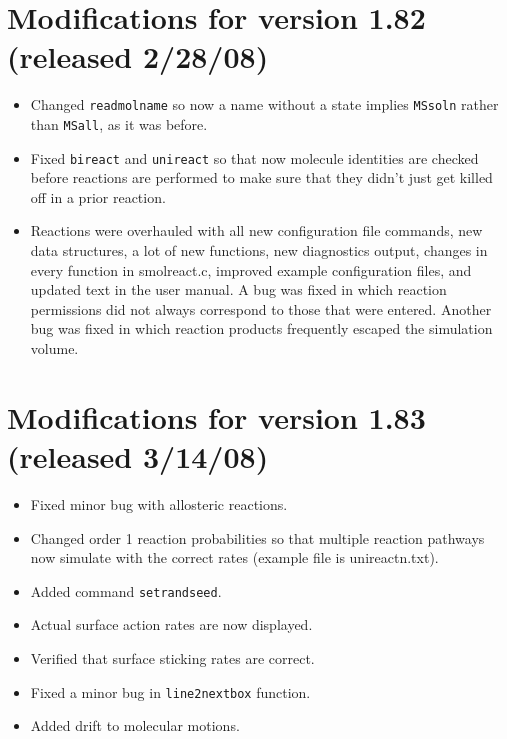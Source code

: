 \documentclass {scrbook}
\newcommand {\ttt} {\texttt}
\begin{document}
\section{Modifications for version 1.82 (released 2/28/08)}
\begin{itemize}
\item Changed \ttt{readmolname} so now a name without a state implies \ttt{MSsoln} rather than \ttt{MSall}, as it was before.
\item Fixed \ttt{bireact} and \ttt{unireact} so that now molecule identities are checked before reactions are performed to make sure that they didn't just get killed off in a prior reaction.
\item Reactions were overhauled with all new configuration file commands, new data structures, a lot of new functions, new diagnostics output, changes in every function in smolreact.c, improved example configuration files, and updated text in the user manual. A bug was fixed in which reaction permissions did not always correspond to those that were entered. Another bug was fixed in which reaction products frequently escaped the simulation volume.
\end{itemize}

\section{Modifications for version 1.83 (released 3/14/08)}
\begin{itemize}
\item Fixed minor bug with allosteric reactions.
\item Changed order 1 reaction probabilities so that multiple reaction pathways now simulate with the correct rates (example file is unireactn.txt).
\item Added command \ttt{setrandseed}.
\item Actual surface action rates are now displayed.
\item Verified that surface sticking rates are correct.
\item Fixed a minor bug in \ttt{line2nextbox} function.
\item Added drift to molecular motions.
\end{itemize}
\end{document}
